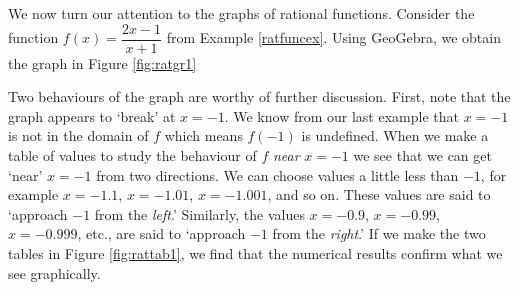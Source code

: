 \medskip

We now turn our attention to the graphs of rational functions. Consider the function $f(x) = \dfrac{2x-1}{x+1}$ from Example \ref{ratfuncex}.  Using GeoGebra, we obtain the graph in Figure \ref{fig:ratgr1}





Two behaviours of the graph are worthy of further discussion.  First, note that the graph appears to `break' at $x=-1$. We know from our last example that $x=-1$ is not in the domain of $f$ which means $f(-1)$ is undefined. When we make a table of values to study the behaviour of $f$ \textit{near} $x=-1$ we see that we can get `near' $x=-1$ from two directions.  We can choose values a little less than $-1$, for example $x=-1.1$, $x=-1.01$, $x=-1.001$, and so on.  These values are said to `approach $-1$ from the \textit{left}.'  Similarly, the values $x=-0.9$, $x=-0.99$, $x=-0.999$, etc., are said to `approach $-1$ from the \textit{right}.'  If we make the two tables in Figure \ref{fig:rattab1}, we find that the numerical results confirm what we see graphically.



